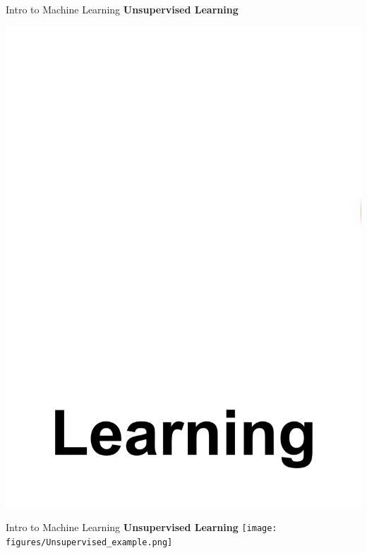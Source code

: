 \documentclass{beamer}
\begin{document}
\begin{frame}[fragile]{Intro to Machine Learning}
    \textbf{Unsupervised Learning}
    \begin{center}
        \includegraphics[width=\textwidth,height=0.7\textheight,keepaspectratio]{figures/UnTarget.png}
    \end{center}
\end{frame}
\begin{frame}[fragile]{Intro to Machine Learning}
    \textbf{Unsupervised Learning}
    \texttt{[image: figures/Unsupervised\_example.png]}
\end{frame}
\end{document}
